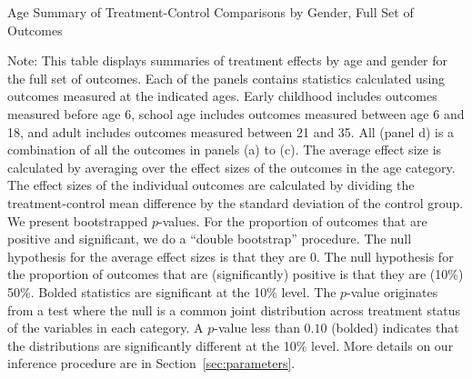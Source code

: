 \begin{table}[h!]
\centering
\begin{threeparttable}
\caption{Age Summary of Treatment-Control Comparisons by Gender, Full Set of Outcomes}\label{tab:rosenbaum-table-age-exp-TvC-big}

\begin{tablenotes}
\item \tiny Note:  This table displays summaries of treatment effects by age and gender for the full set of outcomes. Each of the panels contains statistics calculated using outcomes measured at the indicated ages. Early childhood includes outcomes measured before age 6, school age includes outcomes measured between age 6 and 18, and adult includes outcomes measured between 21 and 35. All (panel d) is a combination of all the outcomes in panels (a) to (c). The average effect size is calculated by averaging over the effect sizes of the outcomes in the age category. The effect sizes of the individual outcomes are calculated by dividing the treatment-control mean difference by the standard deviation of the control group. We present bootstrapped $p$-values. For the proportion of outcomes that are positive and significant, we do a ``double bootstrap'' procedure. The null hypothesis for the average effect sizes is that they are 0. The null hypothesis for the proportion of outcomes that are (significantly) positive is that they are (10\%) 50\%. Bolded statistics are significant at the 10\% level. The \citet{Rosenbaum_2005_Distribution_JRSS} $p$-value originates from a test where the null is a common joint distribution  across treatment status of the variables in each category. A $p$-value less than $0.10$ (bolded) indicates that the distributions are significantly different at the 10\% level. More details on our inference procedure are in Section~\ref{sec:parameters}.
\end{tablenotes}
\end{threeparttable}
\end{table}

